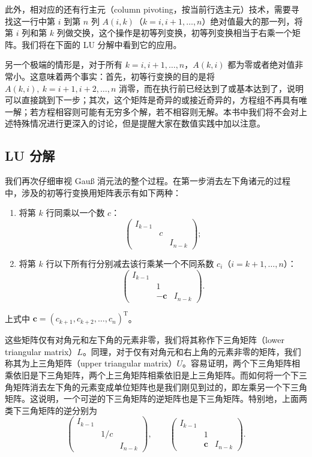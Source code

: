 此外，相对应的还有行主元（column pivoting，按当前行选主元）技术，需要寻找这一行中第 $i$ 到第 $n$ 列 $A(i,k)$（$k=i,i+1,\ldots,n$）绝对值最大的那一列，将第 $i$ 列和第 $k$ 列做交换，这个操作是初等列变换，初等列变换相当于右乘一个矩阵。我们将在下面的 LU 分解中看到它的应用。

另一个极端的情形是，对于所有 $k=i,i+1,\ldots,n$，$A(k,i)$ 都为零或者绝对值非常小。这意味着两个事实：首先，初等行变换的目的是将 $A(k,i),\ k=i+1,i+2,\ldots,n$ 消零，而在执行前已经达到了或基本达到了，说明可以直接跳到下一步；其次，这个矩阵是奇异的或接近奇异的，方程组不再具有唯一解；若方程相容则可能有无穷多个解，若不相容则无解。本书中我们将不会对上述特殊情况进行更深入的讨论，但是提醒大家在数值实践中加以注意。

\subsection{LU 分解}

我们再次仔细审视 Gauß 消元法的整个过程。在第一步消去左下角诸元的过程中，涉及的初等行变换用矩阵表示有如下两种：
\begin{enumerate}
\item 将第 $k$ 行同乘以一个数 $c$：
\[
\begin{pmatrix}
I_{k-1}&&\\&c&\\&&I_{n-k}
\end{pmatrix};
\]
\item 将第 $k$ 行以下所有行分别减去该行乘某一个不同系数 $c_i$（$i=k+1,\ldots,n$）：
\[
\begin{pmatrix}
I_{k-1}&&\\&1&\\&-\bm c&I_{n-k}
\end{pmatrix}.
\]
\end{enumerate}
上式中 $\bm c=(c_{k+1},c_{k+2},\ldots,c_n)^{\mathrm T}$。

这些矩阵仅有对角元和左下角的元素非零，我们将其称作下三角矩阵（lower triangular matrix）$L$。同理，对于仅有对角元和右上角的元素非零的矩阵，我们称其为上三角矩阵（upper triangular matrix）$U$。容易证明，两个下三角矩阵相乘依旧是下三角矩阵，两个上三角矩阵相乘依旧是上三角矩阵。而如何将一个下三角矩阵消去左下角的元素变成单位矩阵也是我们刚见到过的，即左乘另一个下三角矩阵。这说明，一个可逆的下三角矩阵的逆矩阵也是下三角矩阵。特别地，上面两类下三角矩阵的逆分别为
\[
\begin{pmatrix}
I_{k-1}&&\\&1/c&\\&&I_{n-k}
\end{pmatrix},\qquad
\begin{pmatrix}
I_{k-1}&&\\&1&\\&\bm c&I_{n-k}
\end{pmatrix}.
\]

